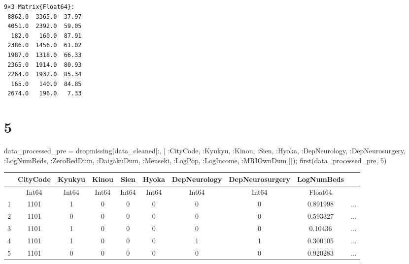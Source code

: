 \documentclass[
  letterpaper,
  DIV=11,
  numbers=noendperiod]{scrreprt}
\newenvironment{Shaded}{\begin{snugshade}}{\end{snugshade}}
\newcommand{\FloatTok}[1]{\textcolor[rgb]{0.68,0.00,0.00}{#1}}
\newcommand{\FunctionTok}[1]{\textcolor[rgb]{0.28,0.35,0.67}{#1}}
\newcommand{\NormalTok}[1]{\textcolor[rgb]{0.00,0.23,0.31}{#1}}
\newcommand{\OperatorTok}[1]{\textcolor[rgb]{0.37,0.37,0.37}{#1}}
\begin{document}
\begin{verbatim}
9×3 Matrix{Float64}:
 8862.0  3365.0  37.97
 4051.0  2392.0  59.05
  182.0   160.0  87.91
 2386.0  1456.0  61.02
 1987.0  1318.0  66.33
 2365.0  1914.0  80.93
 2264.0  1932.0  85.34
  165.0   140.0  84.85
 2674.0   196.0   7.33
\end{verbatim}

\hypertarget{section-24}{%
\section{5}\label{section-24}}

\begin{Shaded}
\begin{Highlighting}[]
\NormalTok{data\_processed\_pre }\OperatorTok{=} \FunctionTok{dropmissing}\NormalTok{(data\_cleaned[}\OperatorTok{:}\NormalTok{, [}
            \OperatorTok{:}\NormalTok{CityCode, }\OperatorTok{:}\NormalTok{Kyukyu, }\OperatorTok{:}\NormalTok{Kinou, }\OperatorTok{:}\NormalTok{Sien, }\OperatorTok{:}\NormalTok{Hyoka,}
            \OperatorTok{:}\NormalTok{DepNeurology, }\OperatorTok{:}\NormalTok{DepNeurosurgery, }\OperatorTok{:}\NormalTok{LogNumBeds,}
            \OperatorTok{:}\NormalTok{ZeroBedDum, }\OperatorTok{:}\NormalTok{DaigakuDum,}
            \OperatorTok{:}\NormalTok{Menseki, }\OperatorTok{:}\NormalTok{LogPop, }\OperatorTok{:}\NormalTok{LogIncome, }\OperatorTok{:}\NormalTok{MRIOwnDum}
\NormalTok{            ]]);}
\FunctionTok{first}\NormalTok{(data\_processed\_pre, }\FloatTok{5}\NormalTok{)}
\end{Highlighting}
\end{Shaded}

\begin{tabular}{r|ccccccccc}
    & CityCode & Kyukyu & Kinou & Sien & Hyoka & DepNeurology & DepNeurosurgery & LogNumBeds & \\
    \hline
    & Int64 & Int64 & Int64 & Int64 & Int64 & Int64 & Int64 & Float64 & \\
    \hline
    1 & 1101 & 1 & 0 & 0 & 0 & 0 & 0 & 0.891998 & $\dots$ \\
    2 & 1101 & 0 & 0 & 0 & 0 & 0 & 0 & 0.593327 & $\dots$ \\
    3 & 1101 & 1 & 0 & 0 & 0 & 0 & 0 & 0.10436 & $\dots$ \\
    4 & 1101 & 1 & 0 & 0 & 0 & 1 & 1 & 0.300105 & $\dots$ \\
    5 & 1101 & 0 & 0 & 0 & 0 & 0 & 0 & 0.920283 & $\dots$ \\
\end{tabular}
\end{document}
